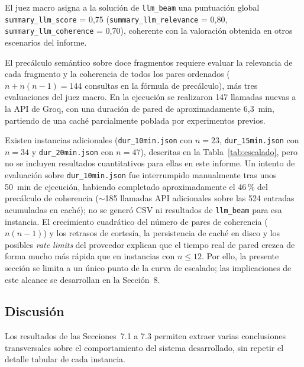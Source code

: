 \documentclass[12pt,a4paper]{article}
\begin{document}
El juez macro asigna a la solución de \texttt{llm\_beam} una puntuación global \linebreak \texttt{summary\_llm\_score} = 0{,}75 (\texttt{summary\_llm\_relevance} = 0{,}80, \linebreak \texttt{summary\_llm\_coherence} = 0{,}70), coherente con la valoración obtenida en otros escenarios del informe.

El precálculo semántico sobre doce fragmentos requiere evaluar la relevancia de cada fragmento y la coherencia de todos los pares ordenados (\(n + n(n-1) = 144\) consultas en la fórmula de precálculo), más tres evaluaciones del juez macro. En la ejecución se realizaron 147 llamadas nuevas a la API de Groq, con una duración de pared de aproximadamente 6{,}3~min, partiendo de una caché parcialmente poblada por experimentos previos.

Existen instancias adicionales (\texttt{dur\_10min.json} con \(n=23\), \texttt{dur\_15min.json} con \(n=34\) y \texttt{dur\_20min.json} con \(n=47\)), descritas en la Tabla~\ref{tab:escalado}, pero no se incluyen resultados cuantitativos para ellas en este informe. Un intento de evaluación sobre \texttt{dur\_10min.json} fue interrumpido manualmente tras unos 50~min de ejecución, habiendo completado aproximadamente el 46\,\% del precálculo de coherencia (\(\sim\)185 llamadas API adicionales sobre las 524 entradas acumuladas en caché); no se generó CSV ni resultados de \texttt{llm\_beam} para esa instancia. El crecimiento cuadrático del número de pares de coherencia (\(n(n-1)\)) y los retrasos de cortesía, la persistencia de caché en disco y los posibles \textit{rate limits} del proveedor explican que el tiempo real de pared crezca de forma mucho más rápida que en instancias con \(n \leq 12\). Por ello, la presente sección se limita a un único punto de la curva de escalado; las implicaciones de este alcance se desarrollan en la Sección~8.


\subsection{Discusión}

Los resultados de las Secciones~7.1 a 7.3 permiten extraer varias conclusiones transversales sobre el comportamiento del sistema desarrollado, sin repetir el detalle tabular de cada instancia.
\end{document}

